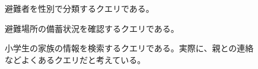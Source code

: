 \begin{figure}[h!]
	
	\caption{避難者を性別で分類するクエリである。}
	\label{sibm_q11}
\end{figure}

\begin{figure}[h!]
	
	\caption{避難場所の備蓄状況を確認するクエリである。}
	\label{sibm_q12}
\end{figure}

\begin{figure}[h!]
	
	\caption{小学生の家族の情報を検索するクエリである。実際に、親との連絡などよくあるクエリだと考えている。}
	\label{sibm_q13}
\end{figure}
